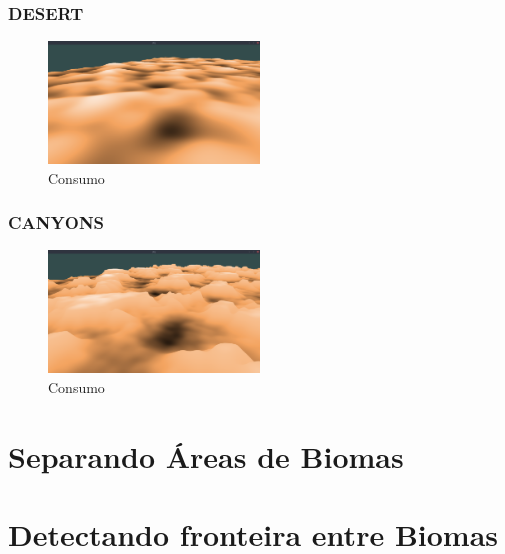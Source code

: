 \subsubsection{DESERT}


\begin{figure}[H]
    \centering
    \includegraphics[width=0.5\textwidth]{figuras/bssDesert.png}
    \caption{Consumo}
    \label{fig:bssDesert}
\end{figure}

\subsubsection{CANYONS}


\begin{figure}[H]
    \centering
    \includegraphics[width=0.5\textwidth]{figuras/bssCanyons.png}
    \caption{Consumo}
    \label{fig:bssCanyons}
\end{figure}

\section{Separando Áreas de Biomas}

\section{Detectando fronteira entre Biomas}